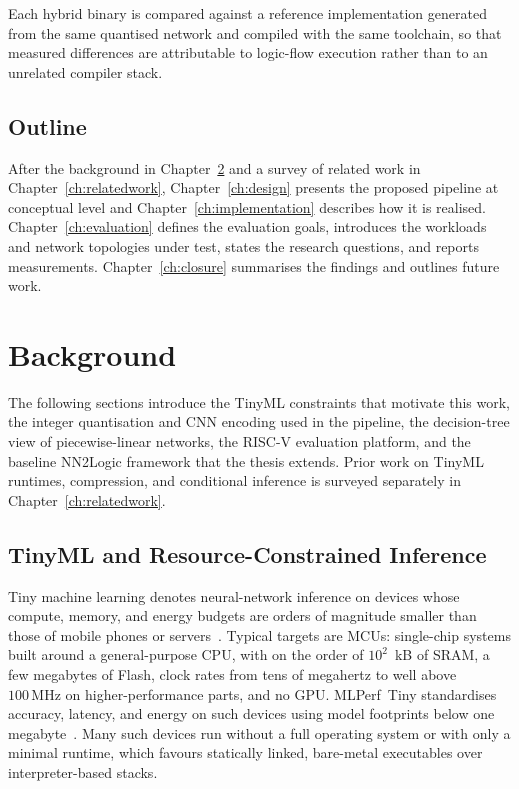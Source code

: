 Each hybrid binary is compared against a reference implementation generated from the same quantised network and compiled with the same toolchain, so that measured differences are attributable to logic-flow execution rather than to an unrelated compiler stack.

\section{Outline}
\label{sec:outline}

After the background in Chapter~\ref{ch:background} and a survey of related work in Chapter~\ref{ch:relatedwork}, Chapter~\ref{ch:design} presents the proposed pipeline at conceptual level and Chapter~\ref{ch:implementation} describes how it is realised.
Chapter~\ref{ch:evaluation} defines the evaluation goals, introduces the workloads and network topologies under test, states the research questions, and reports measurements.
Chapter~\ref{ch:closure} summarises the findings and outlines future work.



\chapter{Background}
\label{ch:background}

The following sections introduce the TinyML constraints that motivate this work, the integer quantisation and \ac{CNN} encoding used in the pipeline, the decision-tree view of piecewise-linear networks, the \mbox{RISC-V} evaluation platform, and the baseline NN2Logic framework that the thesis extends.
Prior work on TinyML runtimes, compression, and conditional inference is surveyed separately in Chapter~\ref{ch:relatedwork}.


\section{TinyML and Resource-Constrained Inference}
\label{sec:bg-tinyml}

Tiny machine learning denotes neural-network inference on devices whose compute, memory, and energy budgets are orders of magnitude smaller than those of mobile phones or servers~\cite{banbury2021mlperftiny,lin2020mcunet}.
Typical targets are \acp{MCU}: single-chip systems built around a general-purpose \ac{CPU}, with on the order of \(10^2\)~kB of \ac{SRAM}, a few megabytes of Flash, clock rates from tens of megahertz to well above \(100\,\mathrm{MHz}\) on higher-performance parts, and no \ac{GPU}.
MLPerf~Tiny standardises accuracy, latency, and energy on such devices using model footprints below one megabyte~\cite{banbury2021mlperftiny}.
Many such devices run without a full operating system or with only a minimal runtime, which favours statically linked, bare-metal executables over interpreter-based stacks.

